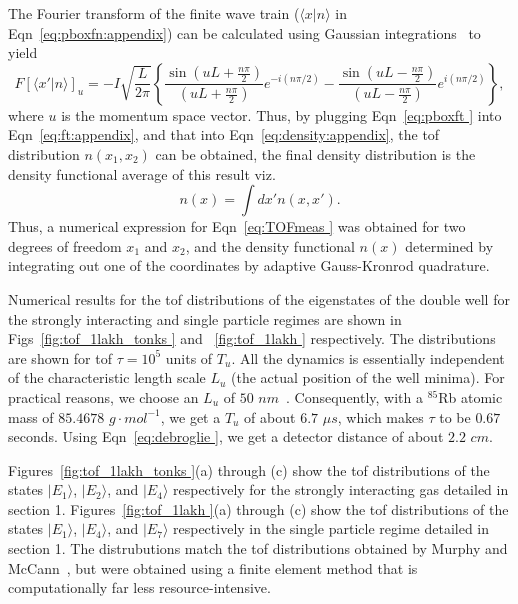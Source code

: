\documentclass{article}
\begin{document}
The Fourier transform of the finite wave train ($\langle x|n\rangle$ in Eqn~\ref{eq:pboxfn:appendix}) can be calculated using Gaussian integrations~\cite{arfken} to yield
\begin{equation}
F[\langle x' | n \rangle]_u = -I\sqrt{\frac{L}{2\pi }}\left \{\frac{\sin{\left(uL+\frac{n\pi }{2}\right)}}{\left(uL+\frac{n\pi}{2}\right)} e^{-i \left(n\pi /2\right)}- \frac{\sin{\left(uL-\frac{n\pi }{2}\right)}}{\left(uL-\frac{n\pi}{2}\right)}e^{i \left(n\pi /2\right)} \right \},
\label{eq:pboxft }
\end{equation}
where $u$ is the momentum space vector. Thus, by plugging Eqn~\ref{eq:pboxft } into Eqn~\ref{eq:ft:appendix}, and that into Eqn~\ref{eq:density:appendix}, the tof distribution $n(x_1,x_2)$ can be obtained, the final density distribution is the density functional average of this result viz.
\begin{equation}
n(x)=\int dx' n(x, x').
\end{equation}
Thus, a numerical expression for Eqn~\ref{eq:TOFmeas } was obtained for two degrees of freedom $x_1$ and $x_2$, and the density functional $n(x)$ determined by integrating out one of the coordinates by adaptive Gauss-Kronrod quadrature. 

Numerical results for the tof distributions of the eigenstates of the double well for the strongly interacting and single particle regimes are shown in Figs~\ref{fig:tof_1lakh_tonks } and ~\ref{fig:tof_1lakh } respectively. The distributions are shown for tof $\tau=10^5$ units of $T_u$. All the dynamics is essentially independent of the characteristic length scale $L_u$ (the actual position of the well minima). For practical reasons, we choose an $L_u$ of $50$ $nm$~\cite{mypaper}. Consequently, with a $^{85}$Rb atomic mass of $85.4678$ $g·mol^{-1}$, we get a $T_u$ of about $6.7$  $\mu s$, which makes $\tau$ to be $0.67$ seconds. Using Eqn~\ref{eq:debroglie }, we get a detector distance of about $2.2$ $cm$. 

Figures~\ref{fig:tof_1lakh_tonks }(a) through (c) show the tof distributions of the states $| E_1\rangle$, $| E_2\rangle$, and $| E_4\rangle$ respectively for the strongly interacting gas detailed in section 1.
Figures~\ref{fig:tof_1lakh }(a) through (c) show the tof distributions of the states $| E_1\rangle$, $| E_4\rangle$, and $| E_7\rangle$ respectively in the single particle regime detailed in section 1. The distrubutions match the tof distributions obtained by Murphy and McCann~\cite{McCann:doublewell}, but were obtained using a finite element method that is computationally far less resource-intensive.
\end{document}
